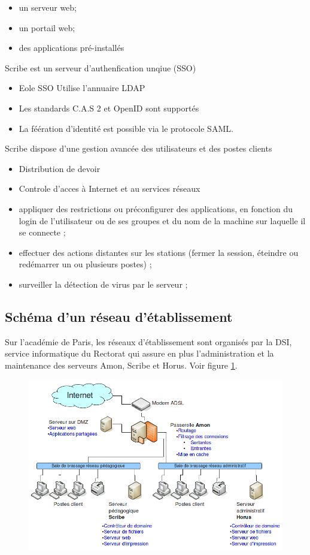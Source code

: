 \documentclass{article}
\makeatletter
\def\maxwidth{\ifdim\Gin@nat@width>\linewidth\linewidth
\else\Gin@nat@width\fi}
\let\Oldincludegraphics\includegraphics
\renewcommand{\includegraphics}[1]{\Oldincludegraphics[width=\maxwidth]{#1}}
\makeatother
\begin{document}
\begin{itemize}
\item
  un serveur web;
\item
  un portail web;
\item
  des applications pré-installés
\end{itemize}
Scribe est un serveur d'authenfication unqiue (SSO)

\begin{itemize}
\item
  Eole SSO Utilise l'annuaire LDAP
\item
  Les standards C.A.S 2 et OpenID sont supportés
\item
  La féération d'identité est possible via le protocole SAML.
\end{itemize}
Scribe dispose d'une gestion avancée des utilisateurs et des postes
clients

\begin{itemize}
\item
  Distribution de devoir
\item
  Controle d'acces à Internet et au services réseaux
\item
  appliquer des restrictions ou pré­configurer des applications, en
  fonction du login de l'utilisateur ou de ses groupes et du nom de la
  machine sur laquelle il se connecte ;
\item
  effectuer des actions distantes sur les stations (fermer la session,
  éteindre ou redémarrer un ou plusieurs postes) ;
\item
  surveiller la détection de virus par le serveur ;
\end{itemize}
\subsection{Schéma d'un réseau d'établissement}

Sur l'académie de Paris, les réseaux d'établissement sont organisés par
la DSI, service informatique du Rectorat qui assure en plus
l'administration et la maintenance des serveurs Amon, Scribe et Horus.
Voir figure \ref{2149feac}.

\begin{figure}[htbp]
\centering
\includegraphics{scribe_html_2149feac.png}
\caption{\label{2149feac}}
\end{figure}
\end{document}
